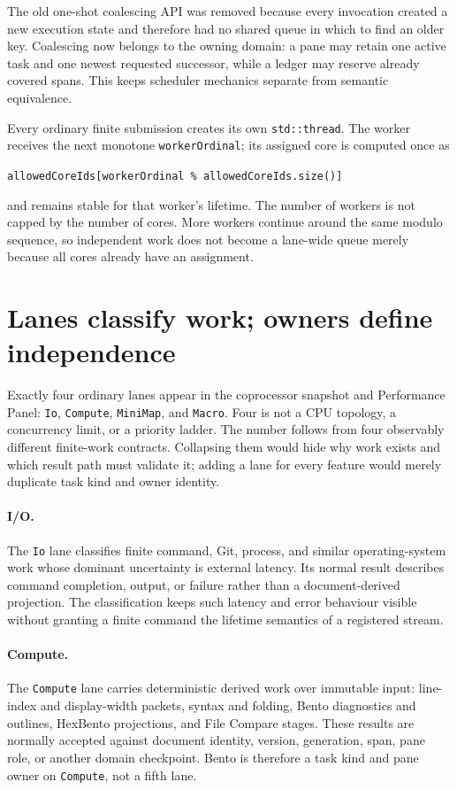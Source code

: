 \documentclass[a4paper,10pt,twoside,openany]{book}
\begin{document}
The old one-shot coalescing API was removed because every invocation created a
new execution state and therefore had no shared queue in which to find an older
key. Coalescing now belongs to the owning domain: a pane may retain one active
task and one newest requested successor, while a ledger may reserve already
covered spans. This keeps scheduler mechanics separate from semantic
equivalence.

Every ordinary finite submission creates its own \texttt{std::thread}. The
worker receives the next monotone \texttt{workerOrdinal}; its assigned core is
computed once as

\begin{center}
\texttt{allowedCoreIds[workerOrdinal \% allowedCoreIds.size()]}
\end{center}

and remains stable for that worker's lifetime. The number of workers is not
capped by the number of cores. More workers continue around the same modulo
sequence, so independent work does not become a lane-wide queue merely because
all cores already have an assignment.

\section{Lanes classify work; owners define independence}

Exactly four ordinary lanes appear in the coprocessor snapshot and Performance
Panel: \texttt{Io}, \texttt{Compute}, \texttt{MiniMap}, and \texttt{Macro}.
Four is not a CPU topology, a concurrency limit, or a priority ladder. The
number follows from four observably different finite-work contracts. Collapsing
them would hide why work exists and which result path must validate it; adding
a lane for every feature would merely duplicate task kind and owner identity.

\paragraph{I/O.}
The \texttt{Io} lane classifies finite command, Git, process, and similar
operating-system work whose dominant uncertainty is external latency. Its
normal result describes command completion, output, or failure rather than a
document-derived projection. The classification keeps such latency and error
behaviour visible without granting a finite command the lifetime semantics of
a registered stream.

\paragraph{Compute.}
The \texttt{Compute} lane carries deterministic derived work over immutable
input: line-index and display-width packets, syntax and folding, Bento
diagnostics and outlines, HexBento projections, and File Compare stages. These
results are normally accepted against document identity, version, generation,
span, pane role, or another domain checkpoint. Bento is therefore a task kind
and pane owner on \texttt{Compute}, not a fifth lane.
\end{document}

